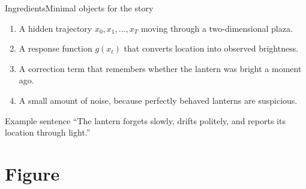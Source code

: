 \documentclass[aspectratio=169,professionalfonts]{beamer}
\begin{document}
\begin{frame}{Ingredients}{Minimal objects for the story}
  \begin{enumerate}
    \item A hidden trajectory $x_0,x_1,\ldots,x_T$ moving through a two-dimensional plaza.
    \item A response function $g(x_t)$ that converts location into observed brightness.
    \item A correction term that remembers whether the lantern was bright a moment ago.
    \item A small amount of noise, because perfectly behaved lanterns are suspicious.
  \end{enumerate}

  \vspace{0.3cm}
  \begin{block}{Example sentence}
    ``The lantern forgets slowly, drifts politely, and reports its location through light.''
  \end{block}
\end{frame}

\section{Figure}
\end{document}
